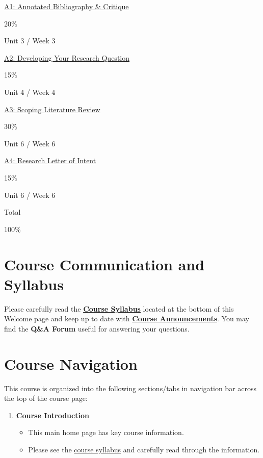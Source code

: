 \documentclass[
  letterpaper,
  DIV=11,
  numbers=noendperiod]{scrreprt}
\providecommand{\tightlist}{%
  \setlength{\itemsep}{0pt}\setlength{\parskip}{0pt}}\usepackage{longtable,booktabs,array}
\begin{document}
\href{https://learn.twu.ca/mod/assign/view.php?id=1169688}{A1: Annotated
Bibliography \& Critique}

20\%

Unit 3 / Week 3

\href{https://learn.twu.ca/mod/assign/view.php?id=1169689}{A2:
Developing Your Research Question}

15\%

Unit 4 / Week 4

\href{https://learn.twu.ca/mod/assign/view.php?id=1169690}{A3: Scoping
Literature Review}

30\%

Unit 6 / Week 6

\href{https://learn.twu.ca/mod/assign/view.php?id=1169691}{A4: Research
Letter of Intent}

15\%

Unit 6 / Week 6

Total

100\%

\section{Course Communication and
Syllabus}\label{course-communication-and-syllabus}

Please carefully read the
\href{https://learn.twu.ca/mod/resource/view.php?id=1171447}{\textbf{Course
Syllabus}} located at the bottom of this Welcome page and keep up to
date with
\href{https://learn.twu.ca/mod/forum/view.php?id=1089396}{\textbf{Course
Announcements}}. You may find the \textbf{Q\&A Forum} useful for
answering your questions.

\section{Course Navigation}\label{course-navigation}

This course is organized into the following sections/tabs in navigation
bar across the top of the course page:

\begin{enumerate}
\def\labelenumi{\arabic{enumi}.}
\tightlist
\item
  \textbf{Course Introduction}

  \begin{itemize}
  \tightlist
  \item
    This main home page has key course information.
  \item
    Please see the
    \href{https://learn.twu.ca/mod/resource/view.php?id=1171447}{course
    syllabus} and carefully read through the information.
  \end{itemize}
\end{enumerate}
\end{document}
